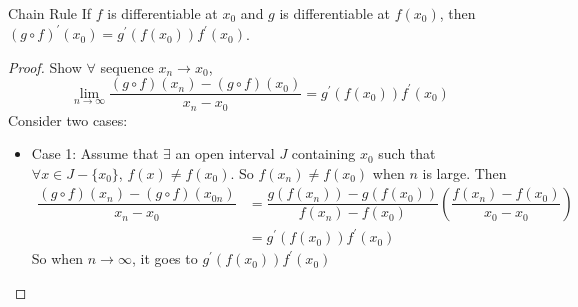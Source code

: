 \documentclass{report}
\begin{document}
\begin{theorem}{Chain Rule}
    If $f$ is differentiable at $x_{0}$ and $g$ is differentiable at $f(x_{0})$, then $(g \circ f)^{\prime}(x_{0}) = g^{\prime}(f(x_{0}))f^{\prime}(x_{0})$.
\end{theorem}
    \begin{proof}
        Show $\forall$ sequence $x_{n} \rightarrow x_{0}$, 
            \begin{equation*}
                \lim\limits_{n  \to \infty} \dfrac{(g \circ f)(x_{n}) - (g \circ f)(x_{0})}{ x_{n} - x_{0}} = g^{\prime}(f(x_{0}))f^{\prime}(x_{0})
            \end{equation*}
        Consider two cases:
            \begin{itemize}
                \item Case 1: Assume that $\exists$ an open interval $J$ containing $x_{0}$ such that $\forall x \in J - \{x_{0}\}$, $f(x) \neq f(x_{0})$. So $f(x_{n}) \neq f(x_{0})$ when $n$ is large. Then
                    \begin{align*}
                        \dfrac{(g \circ f)(x_{n}) - (g \circ f)(x_{0n})}{x_{n} - x_{0}} &= \dfrac{g(f(x_{n}))  - g(f(x_{0}))}{f(x_{n}) - f(x_{0})}\left(\dfrac{f(x_{n}) - f(x_{0})}{x_{0} - x_{0}}\right) \\
                                                                                        &= g^{\prime}(f(x_{0}))f^{\prime}(x_{0})                                                                            
                    \end{align*}
                So when $n \rightarrow \infty$, it goes to $g^{\prime}(f(x_{0})) f^{\prime}(x_{0})$


\end{itemize}
\end{proof}
\end{document}
